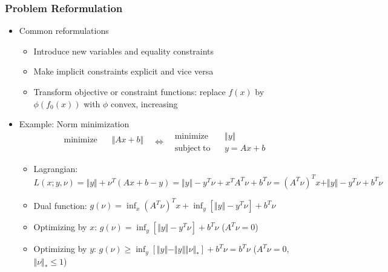 \subsubsection*{Problem Reformulation}
\begin{itemize}
    \item Common reformulations
    \begin{itemize}
        \item Introduce new variables and equality constraints
        \item Make implicit constraints explicit and vice versa
        \item Transform objective or constraint functions: replace $f(x)$ by $\phi(f_0(x))$ with $\phi$ convex, increasing
    \end{itemize}
    \item Example: Norm minimization
    \begin{equation}\begin{aligned}
        \mathrm{minimize}~~&~~\Vert Ax+b \Vert \\ {}
    \end{aligned}~~~\Leftrightarrow~~~\begin{aligned}
        \mathrm{minimize}~~&~~\Vert y\Vert \\
        \mathrm{subject~to}~~&~~y = Ax + b
    \end{aligned}\end{equation}
    \begin{itemize}
        \item Lagrangian: $L(x;y,\nu) = \Vert y\Vert+\nu^T(Ax+b-y) = \Vert y\Vert-y^T\nu+x^TA^T\nu+b^T\nu = (A^T\nu)^Tx + \Vert y\Vert - y^T\nu + b^T\nu$
        \item Dual function: $g(\nu) = \inf_{x}(A^T\nu)^Tx + \inf_{y}\left[\Vert y\Vert - y^T\nu\right] + b^T\nu$
        \item Optimizing by $x$: $g(\nu) = \inf_{y}\left[\Vert y\Vert - y^T\nu\right] + b^T\nu$ ($A^T\nu = 0$)
        \item Optimizing by $y$: $g(\nu)\geq\inf_{y}\left[\Vert y\Vert - \Vert y\Vert\Vert\nu\Vert_\ast\right]+b^T\nu = b^T\nu$ ($A^T\nu = 0$, $\Vert\nu\Vert_\ast\leq 1$)
    \end{itemize}
\end{itemize}
